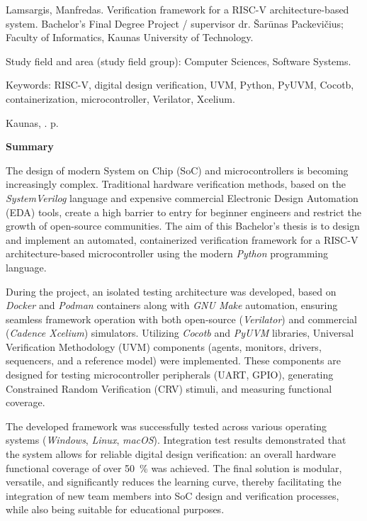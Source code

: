 \clearpage

\thispagestyle{empty}
Lamsargis, Manfredas. Verification framework for a RISC-V architecture-based system. Bachelor's Final Degree Project / supervisor dr. Šarūnas Packevičius; Faculty of Informatics, Kaunas University of Technology.

Study field and area (study field group): Computer Sciences, Software Systems.

Keywords: RISC-V, digital design verification, UVM, Python, PyUVM, Cocotb, containerization, microcontroller, Verilator, Xcelium.

Kaunas, \the\year. \pageref{LastPage} p.

\begin{center}
	\textbf{Summary}
\end{center}

The design of modern System on Chip (SoC) and microcontrollers is becoming increasingly complex. Traditional hardware verification methods, based on the \textit{SystemVerilog} language and expensive commercial Electronic Design Automation (EDA) tools, create a high barrier to entry for beginner engineers and restrict the growth of open-source communities. The aim of this Bachelor's thesis is to design and implement an automated, containerized verification framework for a RISC-V architecture-based microcontroller using the modern \textit{Python} programming language.

During the project, an isolated testing architecture was developed, based on \textit{Docker} and \textit{Podman} containers along with \textit{GNU Make} automation, ensuring seamless framework operation with both open-source (\textit{Verilator}) and commercial (\textit{Cadence Xcelium}) simulators. Utilizing \textit{Cocotb} and \textit{PyUVM} libraries, Universal Verification Methodology (UVM) components (agents, monitors, drivers, sequencers, and a reference model) were implemented. These components are designed for testing microcontroller peripherals (UART, GPIO), generating Constrained Random Verification (CRV) stimuli, and measuring functional coverage.

The developed framework was successfully tested across various operating systems (\textit{Windows}, \textit{Linux}, \textit{macOS}). Integration test results demonstrated that the system allows for reliable digital design verification: an overall hardware functional coverage of over 50~\% was achieved. The final solution is modular, versatile, and significantly reduces the learning curve, thereby facilitating the integration of new team members into SoC design and verification processes, while also being suitable for educational purposes.